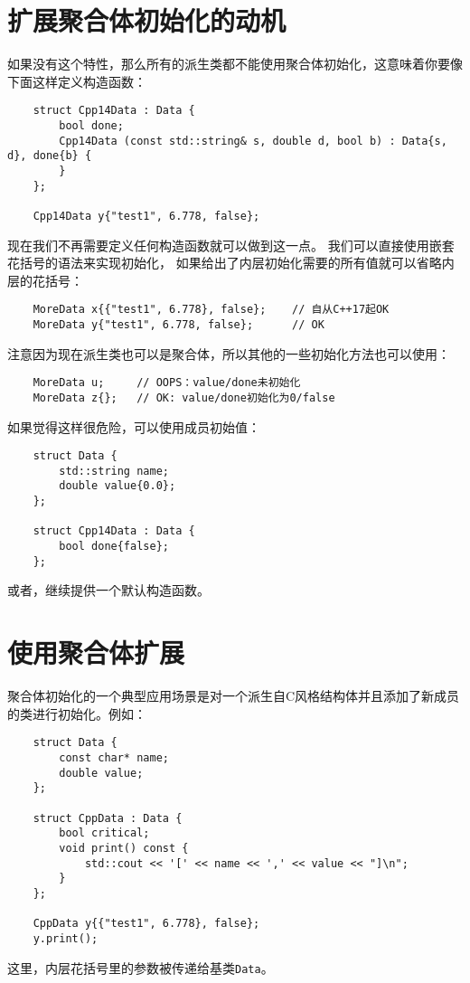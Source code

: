 \section{扩展聚合体初始化的动机}
如果没有这个特性，那么所有的派生类都不能使用聚合体初始化，这意味着你要像下面这样定义构造函数：
\begin{lstlisting}
    struct Cpp14Data : Data {
        bool done;
        Cpp14Data (const std::string& s, double d, bool b) : Data{s, d}, done{b} {
        }
    };

    Cpp14Data y{"test1", 6.778, false};
\end{lstlisting}
现在我们不再需要定义任何构造函数就可以做到这一点。
我们可以直接使用嵌套花括号的语法来实现初始化，
如果给出了内层初始化需要的所有值就可以省略内层的花括号：
\begin{lstlisting}
    MoreData x{{"test1", 6.778}, false};    // 自从C++17起OK
    MoreData y{"test1", 6.778, false};      // OK
\end{lstlisting}
注意因为现在派生类也可以是聚合体，所以其他的一些初始化方法也可以使用：
\begin{lstlisting}
    MoreData u;     // OOPS：value/done未初始化
    MoreData z{};   // OK: value/done初始化为0/false
\end{lstlisting}
如果觉得这样很危险，可以使用成员初始值：
\begin{lstlisting}
    struct Data {
        std::string name;
        double value{0.0};
    };

    struct Cpp14Data : Data {
        bool done{false};
    };
\end{lstlisting}
或者，继续提供一个默认构造函数。

\section{使用聚合体扩展}
聚合体初始化的一个典型应用场景是对一个派生自C风格结构体并且添加了新成员的类进行初始化。例如：
\begin{lstlisting}
    struct Data {
        const char* name;
        double value;
    };

    struct CppData : Data {
        bool critical;
        void print() const {
            std::cout << '[' << name << ',' << value << "]\n";
        }
    };

    CppData y{{"test1", 6.778}, false};
    y.print();
\end{lstlisting}
这里，内层花括号里的参数被传递给基类\texttt{Data}。


